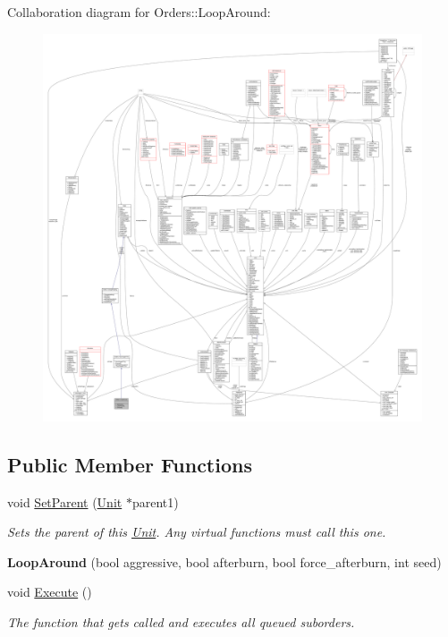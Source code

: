 Collaboration diagram for Orders\+:\+:Loop\+Around\+:
\nopagebreak
\begin{figure}[H]
\begin{center}
\leavevmode
\includegraphics[width=350pt]{d1/d20/classOrders_1_1LoopAround__coll__graph}
\end{center}
\end{figure}
\subsection*{Public Member Functions}
\begin{DoxyCompactItemize}
\item 
void \hyperlink{classOrders_1_1LoopAround_a429622468f6a69d1d9784bb2de75df7b}{Set\+Parent} (\hyperlink{classUnit}{Unit} $\ast$parent1)\hypertarget{classOrders_1_1LoopAround_a429622468f6a69d1d9784bb2de75df7b}{}\label{classOrders_1_1LoopAround_a429622468f6a69d1d9784bb2de75df7b}

\begin{DoxyCompactList}\small\item\em Sets the parent of this \hyperlink{classUnit}{Unit}. Any virtual functions must call this one. \end{DoxyCompactList}\item 
{\bfseries Loop\+Around} (bool aggressive, bool afterburn, bool force\+\_\+afterburn, int seed)\hypertarget{classOrders_1_1LoopAround_a4a8e848af8bbcf52cb56d4d0383b2ddb}{}\label{classOrders_1_1LoopAround_a4a8e848af8bbcf52cb56d4d0383b2ddb}

\item 
void \hyperlink{classOrders_1_1LoopAround_a3564034cd8d456733287f16aec69175c}{Execute} ()\hypertarget{classOrders_1_1LoopAround_a3564034cd8d456733287f16aec69175c}{}\label{classOrders_1_1LoopAround_a3564034cd8d456733287f16aec69175c}

\begin{DoxyCompactList}\small\item\em The function that gets called and executes all queued suborders. \end{DoxyCompactList}\end{DoxyCompactItemize}
